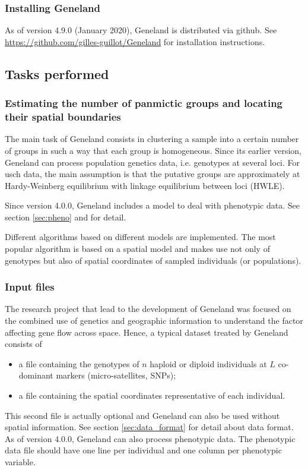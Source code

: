 \documentclass{article}
\begin{document}
 
\subsubsection{Installing {\sc Geneland}}\label{sec:installGeneland}
 
As of version 4.9.0 (January 2020), Geneland is distributed via github.
See \href{https://github.com/gilles-guillot/Geneland}{https://github.com/gilles-guillot/Geneland} for installation instructions.

\subsection{Tasks performed}  
\subsubsection{Estimating the number of panmictic groups and locating their spatial boundaries}

The main task of {\sc Geneland} consists in clustering a sample 
into a certain number of groups in such a way that each group is homogeneous.
Since its earlier version, Geneland can process population genetics data, i.e. genotypes at several loci. 
For usch data, the main assumption is that the putative groups are 
approximately at Hardy-Weinberg equilibrium with 
linkage equilibrium between loci (HWLE). 

Since version 4.0.0, Geneland includes a model to deal with phenotypic data. 
See section \ref{sec:pheno} and \citet{Guillot12a} for detail. 

Different algorithms based on different models are implemented. The most popular algorithm is based on a spatial model 
and makes use not only of genotypes but also of spatial coordinates of sampled individuals (or populations). 

\subsubsection{Input files}



The research project that lead to the development of {\sc Geneland} was  focused on the combined use of genetics and geographic 
information to understand the factor affecting gene flow across space.
Hence, a typical dataset treated by {\sc Geneland} consists of 
\begin{itemize}
\item a file containing the genotypes of 
$n$ haploid or diploid  individuals at $L$ co-dominant  markers (micro-satellites, SNPs);
\item a file containing the spatial coordinates representative of each individual.
\end{itemize}
This second file is actually optional and {\sc Geneland} can also be used without spatial information.
See section \ref{sec:data_format} for detail about data format.
As of version 4.0.0, Geneland can also process phenotypic data. 
The phenotypic data file should have one line per individual and one column per phenotypic variable. 
\end{document}

